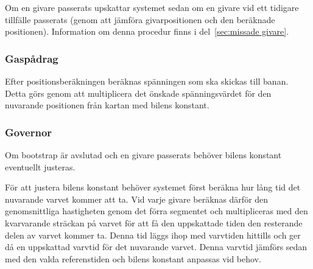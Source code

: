 Om en givare passerats upskattar systemet sedan om en givare vid ett tidigare
tillfälle passerats (genom att jämföra givarpositionen och den beräknade
positionen). Information om denna procedur finns i del~\ref{sec:missade givare}.


\subsubsection{Gaspådrag}

Efter positionsberäkningen beräknas spänningen som ska skickas till banan. Detta
görs genom att multiplicera det önskade spänningsvärdet för den nuvarande
positionen från kartan med bilens konstant.

% 
%  

\subsubsection{Governor}
\label{sec:systembeskrivning:governor}

Om bootstrap är avslutad och en givare passerats behöver bilens konstant
eventuellt justeras. 

För att justera bilens konstant behöver systemet först beräkna hur lång tid det
nuvarande varvet kommer att ta. Vid varje givare beräknas därför den genomsnittliga
hastigheten genom det förra segmentet och multipliceras med den kvarvarande
sträckan på varvet för att få den uppskattade tiden den resterande delen av
varvet kommer ta. Denna tid läggs ihop med varvtiden hittills och ger då en
uppskattad varvtid för det nuvarande varvet. Denna varvtid jämförs sedan med den
valda referenstiden och bilens konstant anpassas vid behov.

